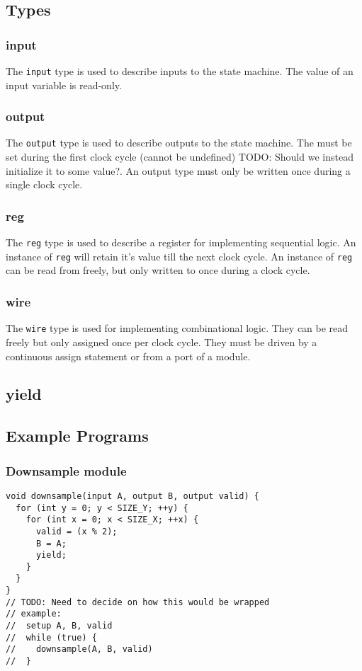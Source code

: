 \documentclass{article}
\newcommand{\TODO}[1]{}
\renewcommand{\TODO}[1]{{\color{red} TODO: {#1}}}
\begin{document}
\subsection{Types}

\subsubsection{input}
The \texttt{input} type is used to describe inputs to the state machine.  The
value of an input variable is read-only.
\subsubsection{output}
The \texttt{output} type is used to describe outputs to the state machine. The
must be set during the first clock cycle (cannot be undefined) \TODO{Should we
instead initialize it to some value?}. An output type must only be written once
during a single clock cycle.
\subsubsection{reg}
The \texttt{reg} type is used to describe a register for implementing
sequential logic. An instance of \texttt{reg} will retain it's value till the
next clock cycle.  An instance of \texttt{reg} can be read from freely, but
only written to once during a clock cycle.
\subsubsection{wire}
The \texttt{wire} type is used for implementing combinational logic. They can
be read freely but only assigned once per clock cycle. They must be driven by a
continuous assign statement or from a port of a module.

\subsection{yield}

\subsection{Example Programs}
\subsubsection{Downsample module}
\begin{verbatim}
void downsample(input A, output B, output valid) {
  for (int y = 0; y < SIZE_Y; ++y) {
    for (int x = 0; x < SIZE_X; ++x) {
      valid = (x % 2);
      B = A;
      yield;
    }
  }
}
// TODO: Need to decide on how this would be wrapped
// example:
//  setup A, B, valid
//  while (true) {
//    downsample(A, B, valid)
//  }
\end{verbatim}
\end{document}

